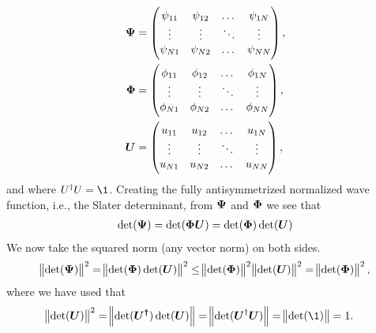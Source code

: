             \begin{align}
                \boldsymbol{\Psi}
                &= \begin{pmatrix}
                    \psi_{11} & \psi_{12} & \dots & \psi_{1N} \\
                    \vdots & \vdots & \ddots & \vdots \\
                    \psi_{N1} & \psi_{N2} & \dots & \psi_{NN}
                \end{pmatrix}, \\
                \boldsymbol{\Phi}
                &= \begin{pmatrix}
                    \phi_{11} & \phi_{12} & \dots & \phi_{1N} \\
                    \vdots & \vdots & \ddots & \vdots \\
                    \phi_{N1} & \phi_{N2} & \dots & \phi_{NN}
                \end{pmatrix}, \\
                \boldsymbol{U}
                &= \begin{pmatrix}
                    u_{11} & u_{12} & \dots & u_{1N} \\
                    \vdots & \vdots & \ddots & \vdots \\
                    u_{N1} & u_{N2} & \dots & u_{NN}
                \end{pmatrix},
            \end{align}
            and where $U^{\dagger}U = \1$. Creating the fully antisymmetrized
            normalized wave function, i.e., the Slater determinant, from
            $\boldsymbol{\Psi}$ and $\boldsymbol{\Phi}$ we see that
            \begin{gather}
                \det(\boldsymbol{\Psi}) = \det(\boldsymbol{\Phi}\boldsymbol{U})
                = \det(\boldsymbol{\Phi})\det(\boldsymbol{U})
            \end{gather}
            We now take the squared norm (any vector norm) on both sides.
            \begin{align}
                \norm{\det(\boldsymbol{\Psi})}^2
                = \norm{\det(\boldsymbol{\Phi})\det(\boldsymbol{U})}^2
                \leq
                \norm{\det(\boldsymbol{\Phi})}^2\norm{\det(\boldsymbol{U})}^2
                = \norm{\det(\boldsymbol{\Phi})}^2,
                \label{eq:squared_determinant}
            \end{align}
            where we have used that
            \begin{align}
                \norm{\det(\vfg{U})}^2
                &= \norm{\det(\vfg{U^{\dagger}})\det(\vfg{U})}
                = \norm{\det(\vfg{U}^{\dagger}\vfg{U})}
                = \norm{\det(\1)} = 1.
            \end{align}
